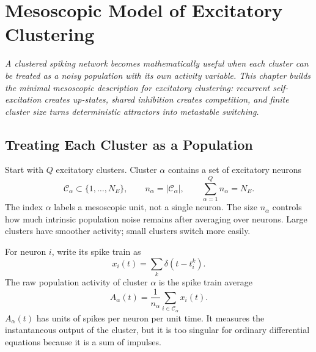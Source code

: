 \chapter{Mesoscopic Model of Excitatory Clustering}
\label{ch:mesoscopic-excitatory-clustering}

\textit{A clustered spiking network becomes mathematically useful when each cluster can be treated as a noisy population with its own activity variable. This chapter builds the minimal mesoscopic description for excitatory clustering: recurrent self-excitation creates up-states, shared inhibition creates competition, and finite cluster size turns deterministic attractors into metastable switching.}

\section{Treating Each Cluster as a Population}
\label{sec:treating-each-cluster-as-population}

Start with $Q$ excitatory clusters. Cluster $\alpha$ contains a set of excitatory neurons
%
\begin{equation}
  \mathcal{C}_{\alpha} \subset \{1,\ldots,N_E\},
  \qquad
  n_{\alpha} = |\mathcal{C}_{\alpha}|,
  \qquad
  \sum_{\alpha=1}^{Q} n_{\alpha} = N_E .
  \label{eq:cluster-sets}
\end{equation}
%
The index $\alpha$ labels a mesoscopic unit, not a single neuron. The size $n_{\alpha}$ controls how much intrinsic population noise remains after averaging over neurons. Large clusters have smoother activity; small clusters switch more easily.

For neuron $i$, write its spike train as
%
\begin{equation}
  x_i(t)=\sum_k \delta(t-t_i^k).
  \label{eq:neuron-spike-train-ch10}
\end{equation}
%
The raw population activity of cluster $\alpha$ is the spike train average
%
\begin{equation}
  A_{\alpha}(t)
  =
  \frac{1}{n_{\alpha}}
  \sum_{i\in \mathcal{C}_{\alpha}} x_i(t).
  \label{eq:raw-cluster-activity}
\end{equation}
%
$A_{\alpha}(t)$ has units of spikes per neuron per unit time. It measures the instantaneous output of the cluster, but it is too singular for ordinary differential equations because it is a sum of impulses.

